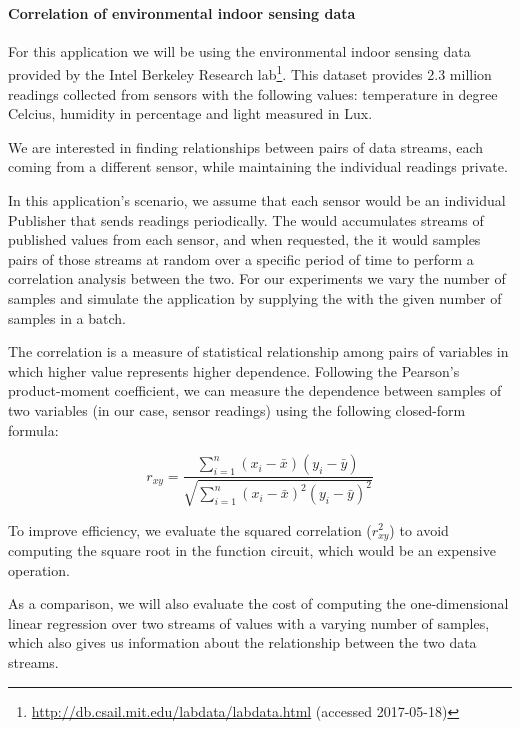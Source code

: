 \paragraph{Correlation of environmental indoor sensing data}

For this application we will be using the environmental indoor sensing data
provided by the Intel Berkeley Research
lab\footnote{\url{http://db.csail.mit.edu/labdata/labdata.html} (accessed
2017-05-18)}.  This dataset provides 2.3 million readings collected
from sensors with the following values: temperature in degree Celcius, humidity
in percentage and light measured in Lux.

We are interested in finding relationships between pairs of data streams, each
coming from a different sensor, while maintaining the individual readings
private.

In this application's scenario, we assume that each sensor would be an
individual Publisher that sends readings periodically.  The \broker would
accumulates streams of published values from each sensor, and when requested,
the it would samples pairs of those streams at random over a specific period of
time to perform a correlation analysis between the two.  For our experiments we
vary the number of samples and simulate the application by supplying the \broker
with the given number of samples in a batch.

The correlation is a measure of statistical relationship among pairs of
variables in which higher value represents higher dependence.  Following the
Pearson's product-moment coefficient, we can measure the dependence between
samples of two variables (in our case, sensor readings) using the following
closed-form formula:

\[
r_{xy} = \frac{\displaystyle\sum_{i=1}^n (x_i - \bar{x}) (y_i - \bar{y})}
{\sqrt{\displaystyle\sum_{i=1}^n (x_i - \bar{x})^2 (y_i - \bar{y})^2}}
\]
\bigskip

To improve efficiency, we evaluate the squared correlation ($r_{xy}^2$) to avoid
computing the square root in the function circuit, which would be an expensive
operation.

As a comparison, we will also evaluate the cost of computing the
one-dimensional linear regression over two streams of values with a varying
number of samples, which also gives us information about the relationship
between the two data streams.

